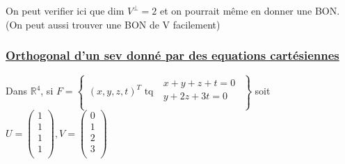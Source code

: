 \documentclass{article}
\begin{document}
On peut verifier ici que dim $V^\perp = 2$ et on pourrait même en donner une BON.\\
(On peut aussi trouver une BON de V facilement)

\subsubsection{\underline{Orthogonal d'un sev donné par des equations cartésiennes}}
Dans $\mathbb{R}^4$, si
$F = \left\{
    \begin{array}{ll}
        (x, y, z, t)^T \mbox{ tq }\; \begin{matrix}
            x + y + z + t = 0\\
            y + 2z + 3t = 0\\
        \end{matrix}
    \end{array}
\right\}$ soit $U = \begin{pmatrix}
    1\\
    1\\
    1\\
    1\\
\end{pmatrix}, V = \begin{pmatrix}
    0\\
    1\\
    2\\
    3\\
\end{pmatrix}$\\
\end{document}
